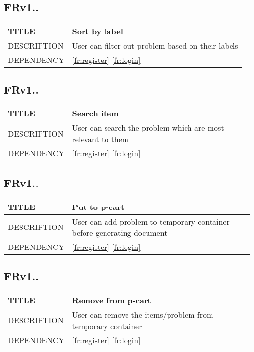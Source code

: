 \documentclass{scrreprt}
\begin{document}
\subsection{FRv1..}
\label{fr:sortp}
\begin{center}
    \begin{tabular}{|l|L{9cm}|}
        \hline
         TITLE& Sort by label\\ \hline
         DESCRIPTION& User can filter out problem based on their labels \\ \hline
         DEPENDENCY& \ref{fr:register} \ref{fr:login}\\ \hline
    \end{tabular}
\end{center}

\subsection{FRv1..}
\label{fr:sortp}
\begin{center}
    \begin{tabular}{|l|L{9cm}|}
        \hline
         TITLE& Search item\\ \hline
         DESCRIPTION& User can search the problem which are most relevant to them\\ \hline
         DEPENDENCY& \ref{fr:register} \ref{fr:login}\\ \hline
    \end{tabular}
\end{center}

\subsection{FRv1..}
\label{fr:putcart}
\begin{center}
    \begin{tabular}{|l|L{9cm}|}
        \hline
         TITLE& Put to p-cart\\ \hline
         DESCRIPTION& User can add problem to temporary container before generating document \\ \hline
         DEPENDENCY& \ref{fr:register} \ref{fr:login}\\ \hline
    \end{tabular}
\end{center}

\subsection{FRv1..}
\label{fr:remcart}
\begin{center}
    \begin{tabular}{|l|L{9cm}|}
        \hline
         TITLE& Remove from p-cart\\ \hline
         DESCRIPTION& User can remove the items/problem from temporary container \\ \hline
         DEPENDENCY& \ref{fr:register} \ref{fr:login}\\ \hline
    \end{tabular}
\end{center}
\end{document}
